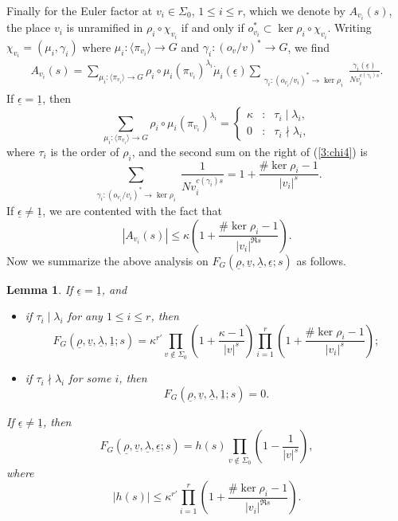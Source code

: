 \documentclass[12pt]{amsart}
\theoremstyle{plain}
\newtheorem{lemma}{Lemma}
\begin{document}
Finally for the Euler factor at $v_i \in \Sigma_0$, $1 \le i \le r$, which we denote by $A_{v_i}(s)$, the place $v_i$ is unramified in $\rho_i \circ \chi_{v_i}$ if and only if $o_{v_i}^* \subset \ker \rho_i \circ \chi_{v_i}$. Writing $\chi_{v_i}=(\mu_i, \gamma_i)$ where $\mu_i: \langle \pi_{v_i} \rangle \to G$ and $\gamma_i: (o_v/v)^* \to G$, we find
\begin{eqnarray} \label{3:chi4} A_{v_i}(s)=\sum_{\mu_{i}:\langle \pi_{v_i} \rangle \to G} \rho_i \circ \mu_i (\pi_{v_i})^{\lambda_i} \dot{\mu}_i({\underline{{\epsilon}}})
\sum_{\substack{\gamma_i: (o_{v_i}/v_i)^* \to \ker \rho_i}} \frac{ \dot{\gamma}_{i}({\underline{{\epsilon}}})}{Nv_i^{c(\gamma_i)s}}. \end{eqnarray}
If ${\underline{{\epsilon}}}={\underline{{1}}}$, then
\[\sum_{\mu_{i}:\langle \pi_{v_i} \rangle \to G} \rho_i \circ \mu_i (\pi_{v_i})^{\lambda_i} =\left\{\begin{array}{ccc}
\kappa&:& \tau_i \mid \lambda_i,\\
0&:& \tau_i \nmid \lambda_i, \end{array}\right.\]
where $\tau_i$ is the order of $\rho_i$, and the second sum on the right of (\ref{3:chi4}) is
\[\sum_{\substack{\gamma_i: (o_{v_i}/v_i)^* \to \ker \rho_i}} \frac{ 1}{Nv_i^{c(\gamma_i)s}}=1+\frac{\# \ker \rho_i-1}{|v_i|^{s}}. \]
If ${\underline{{\epsilon}}} \ne {\underline{{1}}}$, we are contented with the fact that
\[|A_{v_i}(s)| \le \kappa \left(1+\frac{\# \ker \rho_i-1}{|v_i|^{\Re s}}\right).\]
Now we summarize the above analysis on $F_G({\underline{{\rho}}},{\underline{{v}}},{\underline{{\lambda}}},{\underline{{\epsilon}}};s)$ as follows.

\begin{lemma} \label{3:fg} If ${\underline{{\epsilon}}}={\underline{{1}}}$, and
\begin{itemize}
\item[(1.1).] if $\tau_i \mid \lambda_i$ for any $1 \le i \le r$, then
\[F_G({\underline{{\rho}}},{\underline{{v}}},{\underline{{\lambda}}},{\underline{{1}}};s)=\kappa^{r'} \prod_{v \notin \Sigma_0} \left(1+\frac{\kappa-1}{|v|^{s}}\right) \prod_{i=1}^r\left(1+\frac{\# \ker \rho_i-1}{|v_i|^{s}}\right); \]

\item[(1.2).] if $\tau_i \nmid \lambda_i$ for some $i$, then \[F_G({\underline{{\rho}}},{\underline{{v}}},{\underline{{\lambda}}},{\underline{{1}}};s)=0. \]
\end{itemize}
If ${\underline{{\epsilon}}} \ne {\underline{{1}}}$, then
\[F_G({\underline{{\rho}}},{\underline{{v}}},{\underline{{\lambda}}},{\underline{{\epsilon}}};s)= h(s) \prod_{v \notin \Sigma_0} \left(1-\frac{1}{|v|^{s}}\right) ,  \]
where
\[|h(s)| \le \kappa^{r'} \prod_{i=1}^r \left(1+\frac{\# \ker \rho_i-1}{|v_i|^{\Re s}}\right). \]
\end{lemma}
\end{document}
